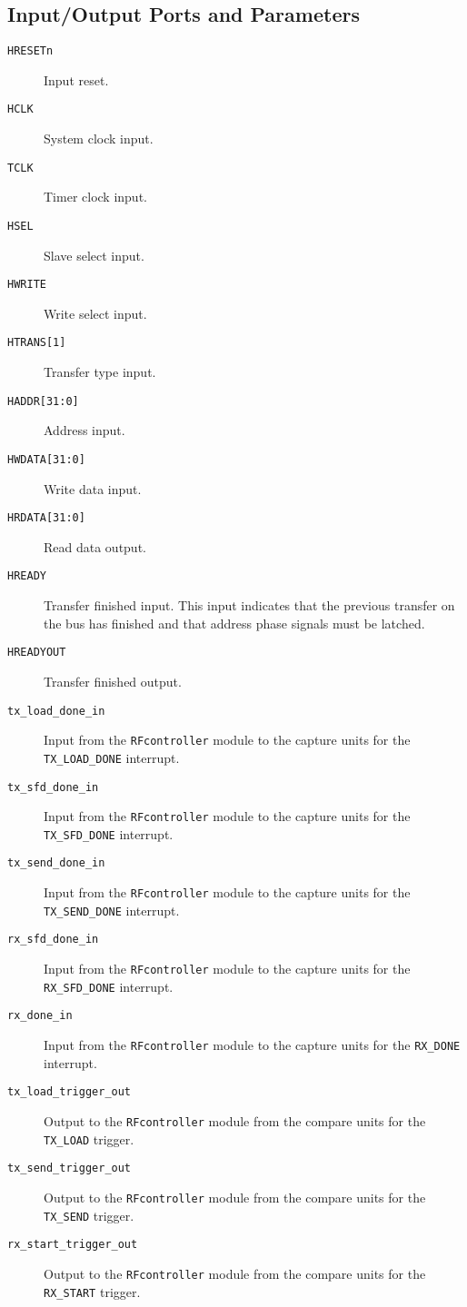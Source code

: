 \subsection{Input/Output Ports and Parameters}
\begin{description}
	\item[\texttt{HRESETn}] Input reset.
	\item[\texttt{HCLK}] System clock input.
	\item[\texttt{TCLK}] Timer clock input.
	\item[\texttt{HSEL}] Slave select input.
	\item[\texttt{HWRITE}] Write select input.
	\item[\texttt{HTRANS[1]}] Transfer type input.
	\item[\texttt{HADDR[31:0]}] Address input.
	\item[\texttt{HWDATA[31:0]}] Write data input.
	\item[\texttt{HRDATA[31:0]}] Read data output.
	\item[\texttt{HREADY}] Transfer finished input. This input indicates that the previous transfer on the bus has finished and that address phase signals must be latched.
	\item[\texttt{HREADYOUT}] Transfer finished output.
	\item[\texttt{tx\_load\_done\_in}] Input from the \texttt{RFcontroller} module to the capture units for the \texttt{TX\_LOAD\_DONE} interrupt.
	\item[\texttt{tx\_sfd\_done\_in}] Input from the \texttt{RFcontroller} module to the capture units for the \texttt{TX\_SFD\_DONE} interrupt.
	\item[\texttt{tx\_send\_done\_in}] Input from the \texttt{RFcontroller} module to the capture units for the \texttt{TX\_SEND\_DONE} interrupt.
	\item[\texttt{rx\_sfd\_done\_in}] Input from the \texttt{RFcontroller} module to the capture units for the \texttt{RX\_SFD\_DONE} interrupt.
	\item[\texttt{rx\_done\_in}] Input from the \texttt{RFcontroller} module to the capture units for the \texttt{RX\_DONE} interrupt.
	\item[\texttt{tx\_load\_trigger\_out}] Output to the \texttt{RFcontroller} module from the compare units for the \texttt{TX\_LOAD} trigger.
	\item[\texttt{tx\_send\_trigger\_out}] Output to the \texttt{RFcontroller} module from the compare units for the \texttt{TX\_SEND} trigger.
	\item[\texttt{rx\_start\_trigger\_out}] Output to the \texttt{RFcontroller} module from the compare units for the \texttt{RX\_START} trigger.

\end{description}
